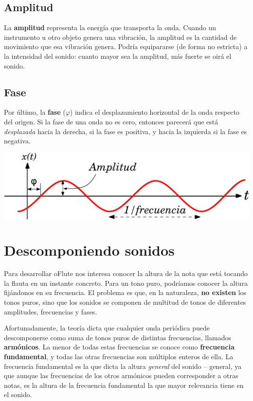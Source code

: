 \subsection{Amplitud}
La \textbf{amplitud} representa la energía que transporta la
onda. Cuando un instrumento u otro objeto genera una vibración, la
amplitud es la cantidad de movimiento que esa vibración genera.
Podría equipararse (de forma no estricta) a la intensidad del sonido:
cuanto mayor sea la amplitud, más fuerte se oirá el sonido.

\subsection{Fase}
Por último, la \textbf{fase} ($\varphi$) indica el desplazamiento
horizontal de la onda respecto del origen. Si la fase de una onda no
es cero, entonces parecerá que está \textit{desplazada} hacia la
derecha, si la fase es positiva, y hacia la izquierda si la fase es
negativa.

\begin{center}
  \includegraphics[scale=0.7]{conceptos/onda}  
\end{center}

\section{Descomponiendo sonidos}
Para desarrollar oFlute nos interesa conocer la altura de la nota que
está tocando la flauta en un instante concreto. Para un tono puro,
podríamos conocer la altura fijándonos en su frecuencia. El problema
es que, en la naturaleza, \textbf{no existen} los tonos puros, sino
que los sonidos se componen de multitud de tonos de diferentes
amplitudes, frecuencias y fases. 

Afortunadamente, la teoría dicta que cualquier onda periódica puede
descomponerse como suma de tonos puros de distintas frecuencias,
llamados \textbf{armónicos}. La menor de todas estas frecuencias se
conoce como \textbf{frecuencia fundamental}, y todas las otras
frecuencias son múltiplos enteros de ella. La frecuencia fundamental
es la que dicta la altura \textit{general} del sonido -- general, ya
que aunque las frecuencias de los otros armónicos pueden corresponder
a otras notas, es la altura de la frecuencia fundamental la que mayor
relevancia tiene en el sonido.

